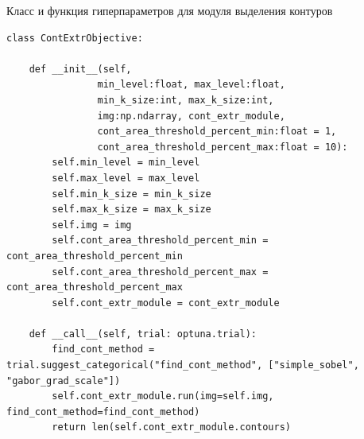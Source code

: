 \documentclass[14pt, russian]{scrartcl}
\begin{document}
\begin{listing}[H]
    \caption{Класс и функция гиперпараметров для модуля выделения контуров}
    \label{lst:contour_extr_sobel}
    \begin{verbatim}
class ContExtrObjective:

    def __init__(self, 
                min_level:float, max_level:float,
                min_k_size:int, max_k_size:int,
                img:np.ndarray, cont_extr_module,
                cont_area_threshold_percent_min:float = 1,
                cont_area_threshold_percent_max:float = 10):
        self.min_level = min_level
        self.max_level = max_level
        self.min_k_size = min_k_size
        self.max_k_size = max_k_size
        self.img = img
        self.cont_area_threshold_percent_min = cont_area_threshold_percent_min
        self.cont_area_threshold_percent_max = cont_area_threshold_percent_max
        self.cont_extr_module = cont_extr_module

    def __call__(self, trial: optuna.trial):
        find_cont_method = trial.suggest_categorical("find_cont_method", ["simple_sobel", "gabor_grad_scale"])
        self.cont_extr_module.run(img=self.img, find_cont_method=find_cont_method)
        return len(self.cont_extr_module.contours)
    \end{verbatim}
\end{listing}
\end{document}
